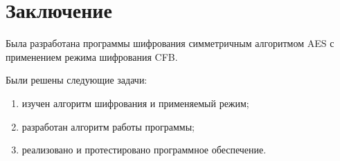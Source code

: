 \section*{Заключение}

Была разработана программы шифрования симметричным алгоритмом
AES с применением режима шифрования CFB.

Были решены следующие задачи:
\begin{enumerate}
    \item изучен алгоритм шифрования и применяемый режим;
    \item разработан алгоритм работы программы;
    \item реализовано и протестировано программное обеспечение.
\end{enumerate}

